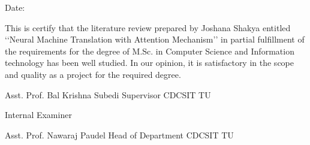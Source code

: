 \vspace{1cm}

\begin{flushright}
Date: \dottedline{4cm}
\end{flushright}

\vspace{1cm}

This is certify that the literature review prepared by Joshana Shakya entitled {\lq\lq Neural Machine Translation with Attention Mechanism\rq\rq} in partial fulfillment of the requirements for the degree of M.Sc. in Computer Science and Information technology has been well studied. In our opinion, it is satisfactory in the scope and quality as a project for the required degree. 

\vspace{2cm}

\begin{flushleft}
\dottedline{5.8cm} \newline
Asst. Prof. Bal Krishna Subedi \newline
Supervisor \newline
CDCSIT \newline
TU \newline
\end{flushleft}

\vspace{2cm}

\begin{flushleft}
\dottedline{5.8cm} \newline
Internal Examiner
\end{flushleft}

\vspace{2cm}

\begin{flushleft}
\dottedline{5.8cm} \newline       
Asst. Prof. Nawaraj Paudel \newline
Head of Department
CDCSIT \newline
TU \newline
\end{flushleft}

\clearpage
